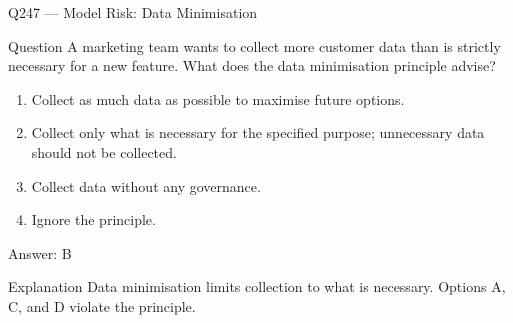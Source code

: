 \documentclass[aspectratio=169,8pt]{beamer}
\begin{document}
																																																						\begin{frame}{Q247 --- Model Risk: Data Minimisation}
																																																							\begin{block}{Question}
																																																								A marketing team wants to collect more customer data than is strictly necessary for a new feature. What does the data minimisation principle advise?
																																																								\begin{enumerate}
																																																									\item Collect as much data as possible to maximise future options.
																																																									\item Collect only what is necessary for the specified purpose; unnecessary data should not be collected.
																																																									\item Collect data without any governance.
																																																									\item Ignore the principle.
																																																								\end{enumerate}  \end{block}
																																																								\begin{exampleblock}{Answer: B}\end{exampleblock}
																																																								\begin{block}{Explanation}
																																																									Data minimisation limits collection to what is necessary. Options A, C, and D violate the principle.
																																																								\end{block}
																																																							\end{frame}
																																																							
\end{document}
